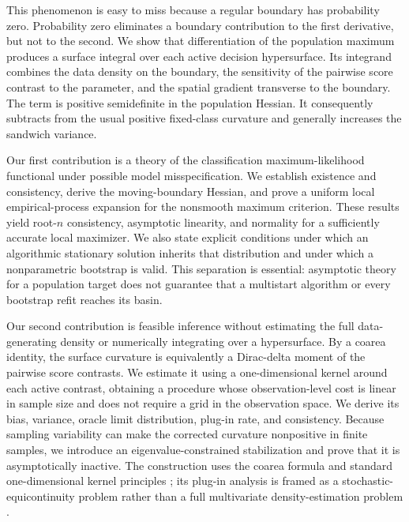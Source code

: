 \documentclass[12pt,a4paper]{article}
\theoremstyle{definition}
\theoremstyle{remark}
\begin{document}
This phenomenon is easy to miss because a regular boundary has probability
zero.  Probability zero eliminates a boundary contribution to the first
derivative, but not to the second.  We show that differentiation of the
population maximum produces a surface integral over each active decision
hypersurface.  Its integrand combines the data density on the boundary, the
sensitivity of the pairwise score contrast to the parameter, and the spatial
gradient transverse to the boundary.  The term is positive semidefinite in the
population Hessian.  It consequently subtracts from the usual positive
fixed-class curvature and generally increases the sandwich variance.

Our first contribution is a theory of the classification maximum-likelihood
functional under possible model misspecification.  We establish existence and
consistency, derive the moving-boundary Hessian, and prove a uniform local
empirical-process expansion for the nonsmooth maximum criterion.  These
results yield root-$n$ consistency, asymptotic linearity, and normality for a
sufficiently accurate local maximizer.  We also state explicit conditions
under which an algorithmic stationary solution inherits that distribution and
under which a nonparametric bootstrap is valid.  This separation is essential:
asymptotic theory for a population target does not guarantee that a multistart
algorithm or every bootstrap refit reaches its basin.

Our second contribution is feasible inference without estimating the full
data-generating density or numerically integrating over a hypersurface.  By a
coarea identity, the surface curvature is equivalently a Dirac-delta moment of
the pairwise score contrasts.  We estimate it using a one-dimensional kernel
around each active contrast, obtaining a procedure whose observation-level
cost is linear in sample size and does not require a grid in the observation
space.  We derive its bias, variance, oracle limit distribution, plug-in rate,
and consistency.  Because sampling variability can make the corrected
curvature nonpositive in finite samples, we introduce an eigenvalue-constrained
stabilization and prove that it is asymptotically inactive.
The construction uses the coarea formula \citep{federer1969geometric} and
standard one-dimensional kernel principles \citep{silverman1986density,
wand1995kernel}; its plug-in analysis is framed as a stochastic-equicontinuity
problem rather than a full multivariate density-estimation problem
\citep{andrews1994empirical}.
\end{document}
